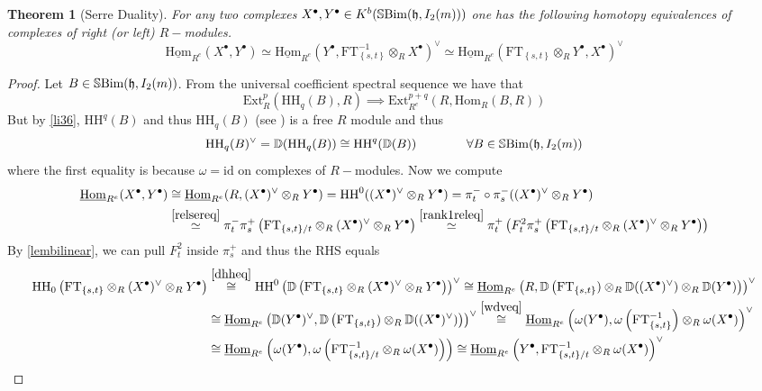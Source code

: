 \documentclass[10pt]{article}
\newtheorem{theorem}{Theorem}
\numberwithin{theorem}{section}
\theoremstyle{definition}
\newcommand{\ext}{\mathrm{Ext}}
\renewcommand{\hom}{\mathrm{Hom}}
\newcommand{\uhom}{\underline{\mathrm{Hom}}}
\newcommand{\hf}{\mathfrak{h}}
\newcommand{\id}{\mathrm{id}}
\newcommand{\Db}{\mathbb{D}}
\newcommand{\sbim}{\mathbb{S}\textnormal{Bim}}
\newcommand{\paren}[1]{\left( #1 \right)}
\newcommand{\set}[1]{\left \{ #1 \right \}}
\newcommand{\hh}{\mathrm{HH}}
\newcommand{\ft}{\mathrm{FT}}
\newcommand{\xcong}[1]{\overset{#1}{\cong}}
\newcommand{\xsim}[1]{\overset{#1}{\simeq}}
\newcommand{\0}{\ \raisebox{-2ex}{\begin{tikzpicture}[xscale=0.25,yscale=0.3,thick,baseline]
 \draw (0,0) -- (0,3); 
\end{tikzpicture}}}
\renewcommand{\1}{\ \raisebox{-2ex}{\begin{tikzpicture}[xscale=0.25,yscale=0.3,thick,baseline]
 \draw (0,0) -- (0,1);
 \draw (0,2) -- (0,3);
 \node[dot] at (0,1) {};
  \node[dot] at (0,2) {};
\end{tikzpicture}}}
\begin{document}
\begin{theorem}[Serre Duality]
    For any two complexes $X^\bullet, Y^\bullet \in K^b(\sbim(\hf, I_2(m)))$ one has the following homotopy equivalences of complexes of right (or left) $R-$modules.
\[
\uhom_{R^e}(X^\bullet,Y^\bullet) \simeq \uhom_{R^e}(Y^\bullet, \mathrm{FT}_{\set{s,t}}^{-1} \otimes_R X^\bullet)^\vee \simeq \uhom_{R^e}(\mathrm{FT}_{\set{s,t}} \otimes_R Y^\bullet, X^\bullet)^\vee 
\]
\end{theorem}
\begin{proof}
    Let $B\in \sbim(\hf, I_2(m))$. From the universal coefficient spectral sequence we have that
    \[ \ext_R^p(\hh_q(B), R)\implies \ext_{R^e}^{p+q}(R, \hom_R(B, R)) \]
    But by \cref{li36}, $\hh^q(B)$ and thus $\hh_q(B)$ (see \cite[Lemma 3.4]{GHMN19}) is a free $R$ module and thus
    \begin{equation}
    \label{dhheq}
      \hh_q(B)^\vee=  \Db(\hh_q(B))\cong \hh^q(\Db(B)) \qquad \qquad \forall B\in \sbim(\hf, I_2(m))
    \end{equation}
    where the first equality is because $\omega=\id$ on complexes of $R-$modules. Now we compute
    \begin{align*}
        \uhom_{R^e}(X^\bullet, Y^\bullet)&\cong  \uhom_{R^e}(R, (X^\bullet)^\vee \otimes_R Y^\bullet)=\hh^0((X^\bullet)^\vee \otimes_R Y^\bullet) =\pi_t^- \circ \pi_s^- (  (X^\bullet)^\vee \otimes_R Y^\bullet ) \\
        & \xsim{\cref{relsereq}}  \pi_t^- \pi_s^+\paren{\ft_{\set{s,t}/t}\otimes_R (X^\bullet)^\vee \otimes_R Y^\bullet} \xsim{\cref{rank1releq}} \pi_t^+\paren{ F_t^2\pi_s^+\paren{\ft_{\set{s,t}/t}\otimes_R (X^\bullet)^\vee \otimes_R Y^\bullet} }
    \end{align*}
    By \cref{lembilinear}, we can pull $F_t^2$ inside $\pi_s^+$ and thus the RHS equals 
    \begin{align*}
        \hh_0\paren{\ft_{\set{s,t}}\otimes_R (X^\bullet)^\vee \otimes_R Y^\bullet} &\xcong{\cref{dhheq}} \hh^0\paren{ \Db\paren{ \ft_{\set{s,t}}\otimes_R (X^\bullet)^\vee \otimes_R Y^\bullet } } ^\vee \xcong{} \uhom_{R^e}\paren{R, \Db\paren{ \ft_{\set{s,t}})\otimes_R \Db((X^\bullet)^\vee) \otimes_R \Db( Y^\bullet) }}^\vee \\
        &\cong \uhom_{R^e}\paren{\Db( Y^\bullet)^\vee, \Db\paren{ \ft_{\set{s,t}})\otimes_R \Db((X^\bullet)^\vee)  }}^\vee\xcong{\cref{wdveq}} \uhom_{R^e}\paren{\omega( Y^\bullet), \omega\paren{ \ft_{\set{s,t}}^{-1}}\otimes_R \omega(X^\bullet)  }^\vee \\
        &\cong\uhom_{R^e}\paren{\omega( Y^\bullet), \omega\paren{ \ft_{\set{s,t}/t}^{-1}\otimes_R \omega(X^\bullet)}  }\cong \uhom_{R^e}\paren{ Y^\bullet,  \ft_{\set{s,t}/t}^{-1}\otimes_R \omega(X^\bullet)  }^\vee
    \end{align*}
\end{proof}
\end{document}
